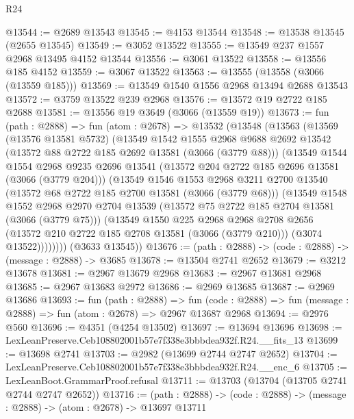 \begin{lexlean}{R24}
\begin{coremodule}
@13544 := @2689 @13543
@13545 := @4153 @13544
@13548 := @13538 @13545 (@2655 @13545)
@13549 := @3052 @13522
@13555 := @13549 @237 @1557 @2968 @13495 @4152 @13544
@13556 := @3061 @13522
@13558 := @13556 @185 @4152
@13559 := @3067 @13522
@13563 := @13555 (@13558 (@3066 (@13559 @185)))
@13569 := @13549 @1540 @1556 @2968 @13494 @2688 @13543
@13572 := @3759 @13522 @239 @2968
@13576 := @13572 @19 @2722 @185 @2688
@13581 := @13556 @19 @3649 (@3066 (@13559 @19))
@13673 := fun (path : @2888) =>
  fun (atom : @2678) =>
  @13532
    (@13548
      (@13563
        (@13569
          (@13576 @13581 @5732)
          (@13549
            @1542
            @1555
            @2968
            @9688
            @2692
            @13542
            (@13572 @88 @2722 @185 @2692 @13581 (@3066 (@3779 @88)))
            (@13549
              @1544
              @1554
              @2968
              @9235
              @2696
              @13541
              (@13572 @204 @2722 @185 @2696 @13581 (@3066 (@3779 @204)))
              (@13549
                @1546
                @1553
                @2968
                @3211
                @2700
                @13540
                (@13572 @68 @2722 @185 @2700 @13581 (@3066 (@3779 @68)))
                (@13549
                  @1548
                  @1552
                  @2968
                  @2970
                  @2704
                  @13539
                  (@13572 @75 @2722 @185 @2704 @13581 (@3066 (@3779 @75)))
                  (@13549
                    @1550
                    @225
                    @2968
                    @2968
                    @2708
                    @2656
                    (@13572 @210 @2722 @185 @2708 @13581 (@3066 (@3779 @210)))
                    (@3074 @13522))))))))
      (@3633 @13545))
@13676 := (path : @2888) -> (code : @2888) -> (message : @2888) -> @3685
@13678 := @13504 @2741 @2652
@13679 := @3212 @13678
@13681 := @2967 @13679 @2968
@13683 := @2967 @13681 @2968
@13685 := @2967 @13683 @2972
@13686 := @2969 @13685
@13687 := @2969 @13686
@13693 := fun (path : @2888) =>
  fun (code : @2888) => fun (message : @2888) => fun (atom : @2678) => @2967 @13687 @2968
@13694 := @2976 @560
@13696 := @4351 (@4254 @13502)
@13697 := @13694 @13696
@13698 := LexLeanPreserve.Ceb108802001b57e7f338e3bbbdea932f.R24.__fits_13
@13699 := @13698 @2741
@13703 := @2982 (@13699 @2744 @2747 @2652)
@13704 := LexLeanPreserve.Ceb108802001b57e7f338e3bbbdea932f.R24.__enc_6
@13705 := LexLeanBoot.GrammarProof.refusal
@13711 := @13703 (@13704 (@13705 @2741 @2744 @2747 @2652))
@13716 := (path : @2888) -> (code : @2888) -> (message : @2888) -> (atom : @2678) -> @13697 @13711

\end{coremodule}
\end{lexlean}
